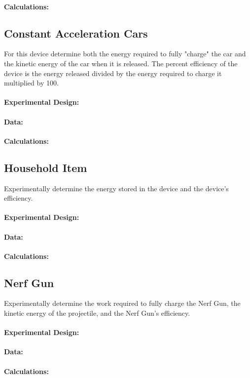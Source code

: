 \documentclass[12pt]{article}
\begin{document}
	\paragraph{Calculations:}
	
	\subsection{Constant Acceleration Cars}
	For this device determine both the energy required to fully "charge" the car and the kinetic energy of the car when it is released. The percent efficiency of the device is the energy released divided by the energy required to charge it multiplied by 100.
	\paragraph{Experimental Design:}
	\paragraph{Data:}
	\paragraph{Calculations:}
	
	\subsection{Household Item}
	Experimentally determine the energy stored in the device and the device's efficiency.
	\paragraph{Experimental Design:}
	\paragraph{Data:}
	\paragraph{Calculations:}
	
	\subsection{Nerf Gun}
	Experimentally determine the work required to fully charge the Nerf Gun, the kinetic energy of the projectile, and the Nerf Gun's efficiency.
	\paragraph{Experimental Design:}
	\paragraph{Data:}
	\paragraph{Calculations:}
	
\end{document}
